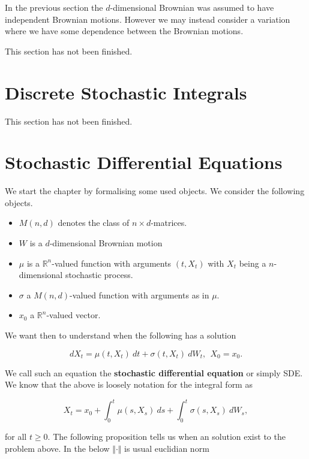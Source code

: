 \documentclass[
]{book}
\providecommand{\tightlist}{%
  \setlength{\itemsep}{0pt}\setlength{\parskip}{0pt}}
\begin{document}
In the previous section the \(d\)-dimensional Brownian was assumed to have independent Brownian motions. However we may instead consider a variation where we have some dependence between the Brownian motions.

This section has not been finished.
\pagebreak

\hypertarget{discrete-stochastic-integrals}{%
\section{Discrete Stochastic Integrals}\label{discrete-stochastic-integrals}}

This section has not been finished.
\pagebreak

\hypertarget{stochastic-differential-equations}{%
\section{Stochastic Differential Equations}\label{stochastic-differential-equations}}

We start the chapter by formalising some used objects. We consider the following objects.

\begin{itemize}
\tightlist
\item
  \(M(n,d)\) denotes the class of \(n\times d\)-matrices.
\item
  \(W\) is a \(d\)-dimensional Brownian motion
\item
  \(\mu\) is a \(\mathbb{R}^n\)-valued function with arguments \((t,X_t)\) with \(X_t\) being a \(n\)-dimensional stochastic process.
\item
  \(\sigma\) a \(M(n,d)\)-valued function with arguments as in \(\mu\).
\item
  \(x_0\) a \(\mathbb{R}^n\)-valued vector.
\end{itemize}

We want then to understand when the following has a solution

\[
dX_t=\mu(t,X_t)\ dt + \sigma(t,X_t)\ dW_t,\ \ X_0=x_0.\tag{5.1/2}
\]

We call such an equation the \textbf{stochastic differential equation} or simply SDE. We know that the above is loosely notation for the integral form as

\[
X_t=x_0+\int_0^t\mu(s,X_s)\ ds +\int_0^t\sigma(s,X_s)\ dW_s,\tag{5.3}
\]

for all \(t\ge 0\). The following proposition tells us when an solution exist to the problem above. In the below \(\Vert \cdot \Vert\) is usual euclidian norm
\end{document}
